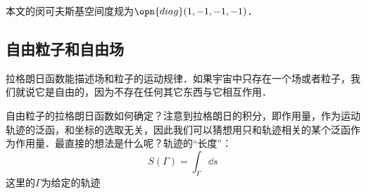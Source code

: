 

本文的闵可夫斯基空间度规为$\opn{diag}(1, -1, -1, -1)$．

\subsection{自由粒子和自由场}

拉格朗日函数能描述场和粒子的运动规律．如果宇宙中只存在一个场或者粒子，我们就说它是自由的，因为不存在任何其它东西与它相互作用．

自由粒子的拉格朗日函数如何确定？注意到拉格朗日的积分，即作用量，作为运动轨迹的泛函，和坐标的选取无关，因此我们可以猜想用只和轨迹相关的某个泛函作为作用量．最直接的想法是什么呢？轨迹的“长度”：
\begin{equation}
S(\Gamma) = \int_\Gamma \dd s
\end{equation}
这里的$\Gamma$为给定的轨迹



















